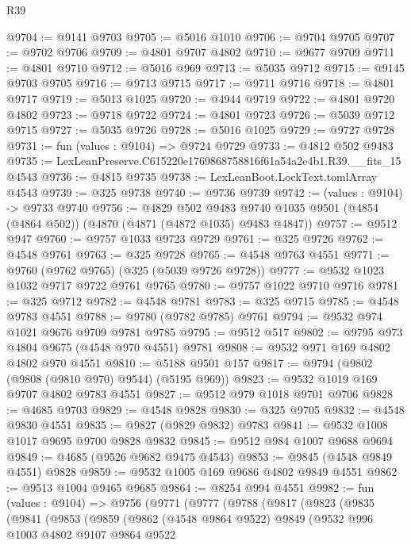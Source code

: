 \begin{lexlean}{R39}
\begin{coremodule}
@9704 := @9141 @9703
@9705 := @5016 @1010
@9706 := @9704 @9705
@9707 := @9702 @9706
@9709 := @4801 @9707 @4802
@9710 := @9677 @9709
@9711 := @4801 @9710
@9712 := @5016 @969
@9713 := @5035 @9712
@9715 := @9145 @9703 @9705
@9716 := @9713 @9715
@9717 := @9711 @9716
@9718 := @4801 @9717
@9719 := @5013 @1025
@9720 := @4944 @9719
@9722 := @4801 @9720 @4802
@9723 := @9718 @9722
@9724 := @4801 @9723
@9726 := @5039 @9712 @9715
@9727 := @5035 @9726
@9728 := @5016 @1025
@9729 := @9727 @9728
@9731 := fun (values : @9104) => @9724 @9729
@9733 := @4812 @502 @9483
@9735 := LexLeanPreserve.C615220e1769868758816f61a54a2e4b1.R39.__fits_15 @4543
@9736 := @4815 @9735
@9738 := LexLeanBoot.LockText.tomlArray @4543
@9739 := @325 @9738
@9740 := @9736 @9739
@9742 := (values : @9104) -> @9733 @9740
@9756 := @4829
    @502
    @9483
    @9740
    @1035
    @9501
    (@4854 (@4864 @502))
    (@4870 (@4871 (@4872 @1035) @9483 @4847))
@9757 := @9512 @947
@9760 := @9757 @1033 @9723 @9729
@9761 := @325 @9726
@9762 := @4548 @9761
@9763 := @325 @9728
@9765 := @4548 @9763 @4551
@9771 := @9760 (@9762 @9765) (@325 (@5039 @9726 @9728))
@9777 := @9532 @1023 @1032 @9717 @9722 @9761 @9765
@9780 := @9757 @1022 @9710 @9716
@9781 := @325 @9712
@9782 := @4548 @9781
@9783 := @325 @9715
@9785 := @4548 @9783 @4551
@9788 := @9780 (@9782 @9785) @9761
@9794 := @9532 @974 @1021 @9676 @9709 @9781 @9785
@9795 := @9512 @517
@9802 := @9795 @973 @4804 @9675 (@4548 @970 @4551) @9781
@9808 := @9532 @971 @169 @4802 @4802 @970 @4551
@9810 := @5188 @9501 @157
@9817 := @9794 (@9802 (@9808 (@9810 @970) @9544) (@5195 @969))
@9823 := @9532 @1019 @169 @9707 @4802 @9783 @4551
@9827 := @9512 @979 @1018 @9701 @9706
@9828 := @4685 @9703
@9829 := @4548 @9828
@9830 := @325 @9705
@9832 := @4548 @9830 @4551
@9835 := @9827 (@9829 @9832) @9783
@9841 := @9532 @1008 @1017 @9695 @9700 @9828 @9832
@9845 := @9512 @984 @1007 @9688 @9694
@9849 := @4685 (@9526 @9682 @9475 @4543)
@9853 := @9845 (@4548 @9849 @4551) @9828
@9859 := @9532 @1005 @169 @9686 @4802 @9849 @4551
@9862 := @9513 @1004 @9465 @9685
@9864 := @8254 @994 @4551
@9982 := fun (values : @9104) =>
  @9756
    (@9771
      (@9777
        (@9788
          (@9817
            (@9823
              (@9835
                (@9841
                  (@9853
                    (@9859
                      (@9862
                        (@4548 @9864 @9522)
                        @9849
                        (@9532
                          @996
                          @1003
                          @4802
                          @9107
                          @9864
                          @9522

\end{coremodule}
\end{lexlean}
